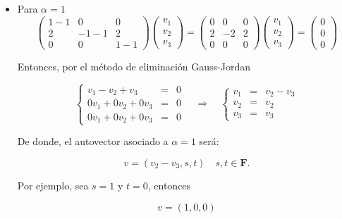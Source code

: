 \begin{enumerate}
\begin{itemize}
	\item Para $\alpha=1$
	    $$
	    \left(\begin{array}{*{3}{c}}
		1-1 & 0 & 0\\
		2 & -1-1 & 2 \\
		0 & 0 & 1-1
	    \end{array}\right) 
	    \left(\begin{array}{*{3}{c}}
		v_1 \\
		v_2 \\
		v_3
	    \end{array}\right) = 
	    \left(\begin{array}{*{3}{c}}
		0 & 0 & 0 \\
		2 & -2 & 2 \\
		0 & 0 & 0
	    \end{array}\right)
	    \left(\begin{array}{*{3}{c}}
		v_1 \\
		v_2 \\
		v_3
	    \end{array}\right) = 
	    \left(\begin{array}{*{3}{c}}
		0 \\
		0 \\
		0	
	    \end{array}\right) 
	    $$

	    Entonces, por el método de eliminación Gauss-Jordan

	    $$\left\{\begin{array}{rcl}
		v_1-v_2+v_3 &=& 0\\
		0v_1+0v_2+0v_3 &=& 0\\
		0v_1+0v_2+0v_3 &=& 0
	    \end{array}\right.
	    \quad \Rightarrow \quad
	    \left\{\begin{array}{rcl}
		v_1 &=& v_2-v_3\\
		v_2 &=& v_2\\
		v_3 &=& v_3
	    \end{array}\right.$$

	    De donde, el autovector asociado a $\alpha=1$ será:\\
	    \begin{tcolorbox}
	    $$v=(v_2-v_3,s,t) \quad s,t\in \textbf{F}.$$
	    \end{tcolorbox}

	    Por ejemplo, sea $s=1$ y $t=0$, entonces
	    \begin{tcolorbox}
		\begin{equation}
		    v=(1,0,0)
		\end{equation}
	    \end{tcolorbox}


\end{itemize}
\end{enumerate}
